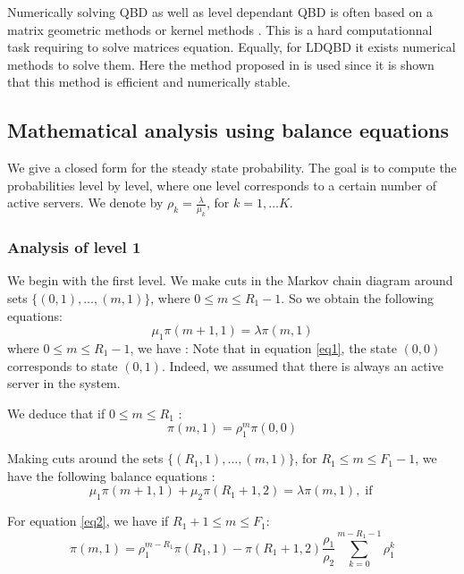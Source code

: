 \documentclass[conference]{IEEEtran}
\begin{document}
Numerically solving QBD as well as level dependant QBD is often based on a matrix geometric methods 
\cite{Neuts1981,art:latoucherama} or kernel methods \cite{gaujal2006optimal}. This is a hard computationnal task requiring to solve
matrices equation. Equally, for LDQBD it exists numerical methods to solve them. Here the method proposed in  \cite{baumann2010numerical} is used
since it is shown that this method is efficient and numerically stable.


\subsection{Mathematical analysis using balance equations} %
We give a closed form for the steady state probability. The goal is to compute the probabilities level by level,
where one level corresponds to a certain number of  active servers. We denote by $\rho_k = \frac{\lambda}{\mu_k}$, for $k=1,\ldots K$.

\subsubsection{Analysis of level 1}
We begin with the first level. We make cuts  in the Markov chain diagram around sets $\{(0,1), \ldots, (m,1)\}$, where $0\leq m \leq R_1-1$. 
So we obtain the following equations:  
 \begin{equation}
 \mu_1 \pi(m+1,1)= \lambda \pi(m,1)\label{eq1}
 \end{equation}
where $0 \leq m \leq   R_1-1$, we have :
 Note that in equation \ref{eq1}, the state $(0,0)$ corresponds to state $(0,1)$. Indeed, we  assumed that there is always an active server in the system.

\noindent We   deduce that if $0\leq m \leq R_1$ :
 \begin{equation}
 \pi(m,1)=\rho_1^{m} \pi(0,0)
 \label{eq1b}
 \end{equation}

\noindent Making cuts around the sets $\{(R_1,1), \ldots, (m,1)\}$, for  $R_1 \leq m \leq   F_1-1$, we have the following balance equations :
 \begin{equation}
 \mu_1 \pi(m+1,1) + \mu_2 \pi(R_1+1,2)  = \lambda \pi(m,1),  \;\mbox{if}\;  \label{eq2}
 \end{equation}


\noindent For equation \ref{eq2}, we have if $R_1+1 \leq m \leq   F_1$:
\begin{equation}
\pi(m,1)=\rho_1^{m-R_1} \pi(R_1,1)-\pi(R_1+1,2)\frac{\rho_1}{\rho_2}\sum_{k=0}^{m-R_1-1} \rho_1^k \label{eq4}
\end{equation}
\end{document}
